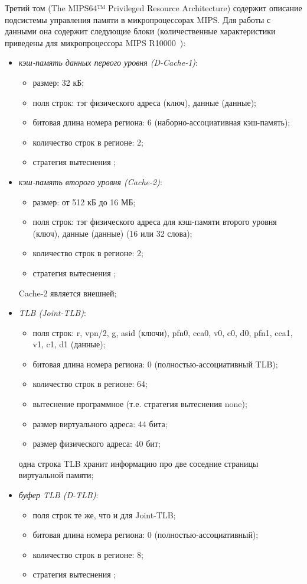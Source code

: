 Третий том (The MIPS64™ Privileged Resource Architecture) содержит описание подсистемы управления памяти в
микропроцессорах MIPS. Для работы с данными она содержит следующие блоки (количественные
характеристики приведены для микропроцессора MIPS R10000~\cite{R10000}):
\begin{itemize}
  \item \emph{кэш-память данных первого уровня (D-Cache-1)}:
        \begin{itemize}
            \item размер: 32 кБ;
            \item поля строк: тэг физического адреса (ключ), данные (данные);
            \item битовая длина номера региона: 6 (наборно-ассоциативная
кэш-память);
            \item количество строк в регионе: 2;
            \item стратегия вытеснения \LRU;
        \end{itemize}
  \item \emph{кэш-память второго уровня (Cache-2)}:
        \begin{itemize}
            \item размер: от 512 кБ до 16 МБ;
            \item поля строк: тэг физического адреса для кэш-памяти второго
уровня (ключ), данные (данные) (16 или 32 слова);
            \item количество строк в регионе: 2;
            \item стратегия вытеснения \LRU;
        \end{itemize}
         Cache-2 является внешней;
  \item \emph{TLB (Joint-TLB)}:
        \begin{itemize}
            \item поля строк: r, vpn/2, g, asid (ключи), pfn0, cca0, v0, c0, d0,
pfn1, cca1, v1, c1, d1 (данные);
            \item битовая длина номера региона: 0 (полностью-ассоциативный TLB);
            \item количество строк в регионе: 64;
            \item вытеснение программное (т.е. стратегия вытеснения none);
            \item размер виртуального адреса: 44 бита;
            \item размер физического адреса: 40 бит;
        \end{itemize}
        одна строка TLB хранит информацию про две соседние страницы виртуальной
        памяти;
  \item \emph{буфер TLB (D-TLB)}:
        \begin{itemize}
            \item поля строк те же, что и для Joint-TLB;
            \item битовая длина номера региона: 0 (полностью-ассоциативный);
            \item количество строк в регионе: 8;
            \item стратегия вытеснения \LRU;
        \end{itemize}
\end{itemize}

